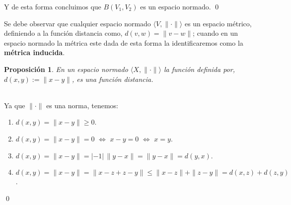 \documentclass[12pt]{book}
\numberwithin{equation}{chapter}
\newtheorem{proposition}[theorem]{Proposici\'on}
\def\n{\noindent}
\def\la{\langle}
\def\ra{\rangle}
\def\sss{\Leftrightarrow}
\begin{document}
\n Y de esta forma concluimos que $B(V_{1},V_{2})$ es un espacio normado.
\qed

\vspace{5 mm}

\n Se debe observar que cualquier espacio normado $ \la V,\| \cdot \| \ra $ es un espacio m\'etrico, definiendo a la funci\'on distancia como, $ d(v,w)= \| v-w \| $; cuando en un espacio normado la m\'etrica este dada de esta forma la identificaremos como la {\bf m\'etrica inducida}. 

\begin{proposition}
En un espacio normado $\la X, \| \cdot \| \ra$ la funci\'on definida por, $ d(x,y):= \|x-y \| $, es una funci\'on distancia.
\end{proposition}
\n {\bf Demostraci\'on}\\
Ya que $\| \cdot \|$ es una norma, tenemos:
\begin{enumerate}
\item $ d(x,y)=\| x-y \|\geq 0 $.
\item $ d(x,y)=\| x-y \|=0$ $\sss$ $ x-y=0 $ $\sss$ $x= y$.
\item $ d(x,y)=\| x-y \|= |-1|\, \| y-x \|=\| y-x \|= d(y,x) $.
\item $ d(x,y)=\| x-y \|=\| x -z+z -y \| \leq \|x-z\| + \| z-y \|=d(x,z)+d(z,y) $.
\end{enumerate}
\qed

\vspace{5 mm}
\end{document}
